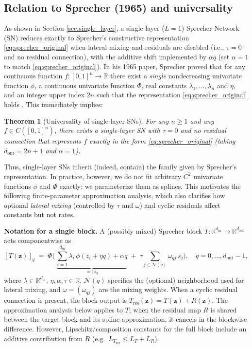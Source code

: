 \documentclass{article}
\theoremstyle{plain}
\newtheorem{theorem}{Theorem}
\theoremstyle{definition}
\theoremstyle{remark}
\begin{document}
\subsection{Relation to Sprecher (1965) and universality}
As shown in Section \ref{sec:single_layer}, a single-layer ($L=1$) Sprecher Network (SN) reduces exactly to Sprecher's constructive representation \eqref{eq:sprecher_original} when lateral mixing and residuals are disabled (i.e., $\tau=0$ and no residual connection), with the additive shift implemented by $\alpha q$ (set $\alpha=1$ to match \eqref{eq:sprecher_original}). In his 1965 paper, Sprecher proved that for any continuous function $f:[0,1]^n\to\mathbb{R}$ there exist a \emph{single} nondecreasing univariate function $\phi$, a continuous univariate function $\Phi$, real constants $\lambda_1,\ldots,\lambda_n$ and $\eta$, and an integer upper index $2n$ such that the representation \eqref{eq:sprecher_original} holds \cite{sprecher1965}. This immediately implies:

\begin{theorem}[Universality of single-layer SNs]\label{thm:ua_single_layer}
For any $n\ge 1$ and any $f\in C([0,1]^n)$, there exists a single-layer SN with $\tau=0$ and no residual connection that represents $f$ exactly in the form \eqref{eq:sprecher_original} (taking $d_{\mathrm{out}}=2n+1$ and $\alpha=1$).
\end{theorem}

Thus, single-layer SNs inherit (indeed, contain) the family given by Sprecher's representation. In practice, however, we do not fit arbitrary $C^2$ univariate functions $\phi$ and $\Phi$ exactly; we parameterize them as splines. This motivates the following finite-parameter approximation analysis, which also clarifies how optional \emph{lateral mixing} (controlled by $\tau$ and $\omega$) and cyclic residuals affect constants but not rates.

\medskip
\noindent\textbf{Notation for a single block.}
A (possibly mixed) Sprecher block $T:\mathbb{R}^{d_{\mathrm{in}}}\to\mathbb{R}^{d_{\mathrm{out}}}$ acts componentwise as
$$[T(\mathbf{z})]_q \;=\; \Phi\!\Biggl(\,\underbrace{\sum_{i=1}^{d_{\mathrm{in}}}\lambda_i\,\phi(z_i+\eta q)+\alpha q}_{=:s_q}\;+\;\tau\sum_{j\in\mathcal{N}(q)}\omega_{qj}\,s_j\Biggr),
\quad q=0,\ldots,d_{\mathrm{out}}-1,$$
where $\lambda\in\mathbb{R}^{d_{\mathrm{in}}}$, $\eta,\alpha,\tau\in\mathbb{R}$, $\mathcal{N}(q)$ specifies the (optional) neighborhood used for lateral mixing, and $\omega=(\omega_{qj})$ are the mixing weights. When a cyclic residual connection is present, the block output is $T_{\mathrm{res}}(\mathbf{z})=T(\mathbf{z})+R(\mathbf{z})$. The approximation analysis below applies to $T$; when the residual map $R$ is shared between the target block and its spline approximation, it cancels in the blockwise difference. However, Lipschitz/composition constants for the full block include an additive contribution from $R$ (e.g.\ $L_{T_{\mathrm{res}}}\le L_T+L_R$).
\end{document}
